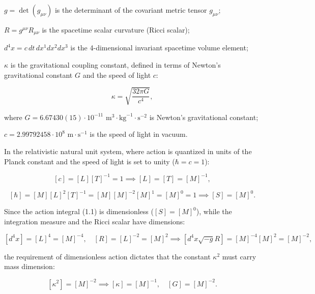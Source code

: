 $g = \det(g_{\mu\nu})$ is the determinant of the covariant metric tensor $g_{\mu\nu}$;  

$R = g^{\mu\nu} R_{\mu\nu}$ is the spacetime scalar curvature (Ricci scalar);  

$d^4x = c \, dt \, dx^1 dx^2 dx^3$ is the 4-dimensional invariant spacetime volume element;  

$\kappa$ is the gravitational coupling constant, defined in terms of Newton's gravitational constant $G$ and the speed of light $c$:

\begin{equation}\label{eq:1.2}\tag{1.2}
\kappa = \sqrt{\frac{32\pi G}{c^4}},
\end{equation}

where $G = 6.67430(15) \cdot 10^{-11}\text{ m}^3\cdot\text{kg}^{-1}\cdot\text{s}^{-2}$ is Newton's gravitational constant;  

$c = 2.99792458 \cdot 10^8\text{ m}\cdot\text{s}^{-1}$ is the speed of light in vacuum.

In the relativistic natural unit system, where action is quantized in units of the Planck constant and the speed of light is set to unity ($\hbar = c = 1$):

\begin{equation}\label{eq:1.4}\tag{1.4}
[c] = [L][T]^{-1} = 1 \implies [L] = [T] = [M]^{-1},
\end{equation}

\begin{equation}\label{eq:1.5}\tag{1.5}
[\hbar] = [M][L]^2[T]^{-1} = [M][M]^{-2}[M]^1 = [M]^0 = 1 \implies [S] = [M]^0.
\end{equation}

Since the action integral (1.1) is dimensionless ($[S] = [M]^0$), while the integration measure and the Ricci scalar have dimensions:

\begin{equation}\label{eq:1.6}\tag{1.6}
[d^4x] = [L]^4 = [M]^{-4}, \quad [R] = [L]^{-2} = [M]^2 \implies [d^4x \sqrt{-g} R] = [M]^{-4} [M]^2 = [M]^{-2},
\end{equation}

the requirement of dimensionless action dictates that the constant $\kappa^2$ must carry mass dimension:

\begin{equation}\label{eq:1.7}\tag{1.7}
[\kappa^2] = [M]^{-2} \implies [\kappa] = [M]^{-1}, \quad [G] = [M]^{-2}.
\end{equation}

